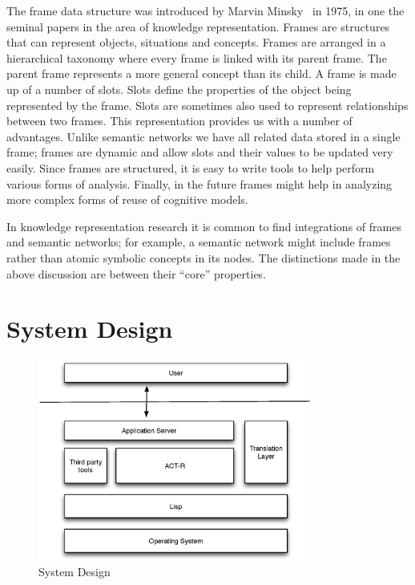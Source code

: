 The frame data structure was introduced by Marvin
Minsky~\cite{Minsky1974a} in 1975, in one the seminal papers in the
area of knowledge representation. Frames are structures that can
represent objects, situations and concepts. Frames are arranged in a
hierarchical taxonomy where every frame is linked with its parent
frame. The parent frame represents a more general concept than its
child\cite{karp-93}. A frame is made up of a number of slots. Slots
define the properties of the object being represented by the
frame. Slots are sometimes also used to represent relationships
between two frames. This representation provides us with a number of
advantages.  Unlike semantic networks we have all related data stored
in a single frame; frames are dynamic and allow slots and their values
to be updated very easily.  Since frames are structured, it is easy to
write tools to help perform various forms of analysis.  Finally, in
the future frames might help in analyzing more complex forms of reuse
of cognitive models.

In knowledge representation research it is common to find integrations
of frames and semantic networks; for example, a semantic network might
include frames rather than atomic symbolic concepts in its nodes.  The
distinctions made in the above discussion are between their ``core''
properties.



\section{System Design}

\begin{figure}[htp]
  \centering
  \includegraphics[width=90mm]{SystemOverview}
  \caption{System Design}
  \label{SysOverview}
\end{figure}

